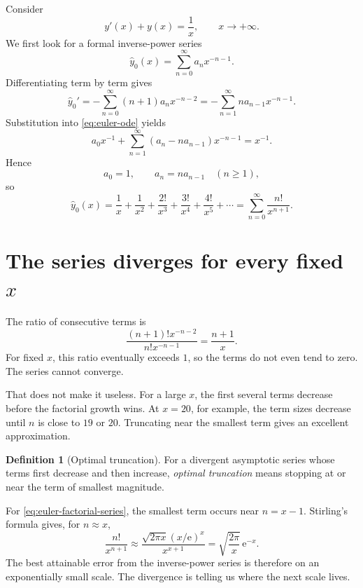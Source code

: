 \documentclass[11pt,openany]{book}
\theoremstyle{definition}
\newtheorem{definition}{Definition}[chapter]
\theoremstyle{plain}
\theoremstyle{remark}
\newcommand{\e}{\mathrm{e}}
\newcommand{\trans}[1]{\widehat{#1}}
\begin{document}
Consider
\begin{equation}\label{eq:euler-ode}
 y'(x)+y(x)=\frac1x,
 \qquad x\to+\infty.
\end{equation}
We first look for a formal inverse-power series
\begin{equation}\label{eq:euler-ansatz}
 \trans y_0(x)=\sum_{n=0}^{\infty}a_nx^{-n-1}.
\end{equation}
Differentiating term by term gives
\[
 \trans y_0'
 =-\sum_{n=0}^{\infty}(n+1)a_nx^{-n-2}
 =-\sum_{n=1}^{\infty}n a_{n-1}x^{-n-1}.
\]
Substitution into \cref{eq:euler-ode} yields
\[
 a_0x^{-1}+\sum_{n=1}^{\infty}(a_n-na_{n-1})x^{-n-1}=x^{-1}.
\]
Hence
\[
 a_0=1,
 \qquad
 a_n=na_{n-1}\quad(n\ge1),
\]
so
\begin{equation}\label{eq:euler-factorial-series}
 \trans y_0(x)=\frac1x+\frac1{x^2}+\frac{2!}{x^3}
 +\frac{3!}{x^4}+\frac{4!}{x^5}+\cdots
 =\sum_{n=0}^{\infty}\frac{n!}{x^{n+1}}.
\end{equation}

\section{The series diverges for every fixed $x$}

The ratio of consecutive terms is
\[
 \frac{(n+1)!x^{-n-2}}{n!x^{-n-1}}=\frac{n+1}{x}.
\]
For fixed $x$, this ratio eventually exceeds $1$, so the terms do not even tend to zero. The series cannot converge.

That does not make it useless. For a large $x$, the first several terms decrease before the factorial growth wins. At $x=20$, for example, the term sizes decrease until $n$ is close to $19$ or $20$. Truncating near the smallest term gives an excellent approximation.

\begin{definition}[Optimal truncation]
For a divergent asymptotic series whose terms first decrease and then increase, \emph{optimal truncation} means stopping at or near the term of smallest magnitude.
\end{definition}

For \cref{eq:euler-factorial-series}, the smallest term occurs near $n=x-1$. Stirling's formula gives, for $n\approx x$,
\[
 \frac{n!}{x^{n+1}}
 \approx \frac{\sqrt{2\pi x}(x/\e)^x}{x^{x+1}}
 =\sqrt{\frac{2\pi}{x}}\,\e^{-x}.
\]
The best attainable error from the inverse-power series is therefore on an exponentially small scale. The divergence is telling us where the next scale lives.
\end{document}
